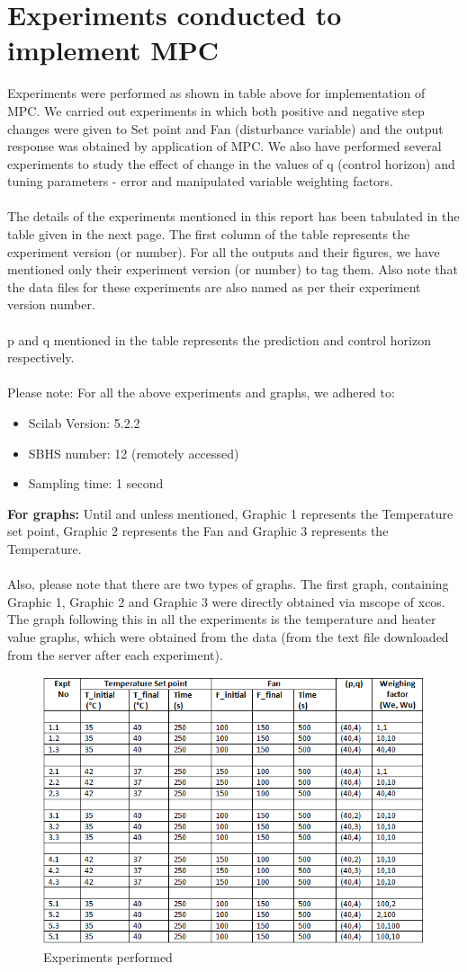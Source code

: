 \section{Experiments conducted to implement MPC}
Experiments were performed as shown in table above for implementation of MPC. We carried out experiments in which both positive and negative step changes were given to Set point and Fan (disturbance variable) and the output response was obtained by application of MPC. We also have performed several experiments to study the effect of change in the values of q (control horizon) and tuning parameters - error and manipulated variable weighting factors. \\ \\
The details of the experiments mentioned in this report has been tabulated in the table given in the next page. The first column of the table represents the experiment version (or number). For all the outputs and their figures, we have mentioned only their experiment version (or number) to tag them. Also note that the data files for these experiments are also named as per their experiment version number. \\ \\
p and q mentioned in the table represents the prediction and control horizon respectively. \\ \\
Please note: For all the above experiments and graphs, we adhered to: 
\begin{itemize}
\item Scilab Version: 5.2.2
\item SBHS number: 12 (remotely accessed)
\item Sampling time: 1 second
\end{itemize}
\textbf{For graphs:} Until and unless mentioned, Graphic 1 represents the Temperature set point, Graphic 2 represents the Fan and Graphic 3 represents the Temperature. \\ \\
Also, please note that there are two types of graphs. The first graph, containing Graphic 1, Graphic 2 and Graphic 3 were directly obtained via mscope of xcos. The graph following this in all the experiments is the temperature and heater value graphs, which were obtained from the data (from the text file downloaded from the server after each experiment).
\begin{figure}[H]
\centering
  \includegraphics[width=0.7\linewidth]{mpc/table_normal.png}
  \caption{Experiments performed}
\end{figure}
